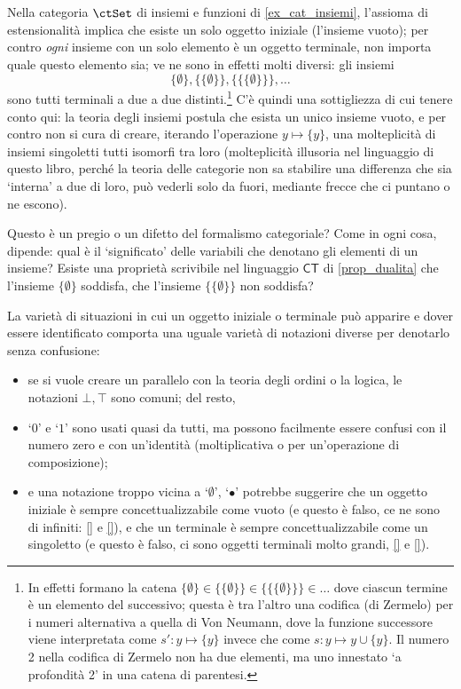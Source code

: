 \begin{example}\label{init_strict_term_many}
 Nella categoria \(\ctSet\) di insiemi e funzioni di \ref{ex_cat_insiemi}, l'assioma di estensionalità implica che esiste un solo oggetto iniziale (l'insieme vuoto); per contro \emph{ogni} insieme con un solo elemento è un oggetto terminale, non importa quale questo elemento sia; ve ne sono in effetti molti diversi: gli insiemi
 \[\{\emptyset\},\{\{\emptyset\}\},\{\{\{\emptyset\}\}\},\dots\]
 sono tutti terminali a due a due distinti.\footnote{In effetti formano la catena $\{\emptyset\}\in\{\{\emptyset\}\}\in\{\{\{\emptyset\}\}\}\in\dots$ dove ciascun termine è un elemento del successivo; questa è tra l'altro una codifica (di Zermelo) per i numeri alternativa a quella di Von Neumann, dove la funzione successore viene interpretata come $s' : y \mapsto \{y\}$ invece che come $s : y\mapsto y \cup \{y\}$. Il numero 2 nella codifica di Zermelo non ha due elementi, ma uno innestato `a profondità 2' in una catena di parentesi.} C'è quindi una sottigliezza di cui tenere conto qui: la teoria degli insiemi postula che esista un unico insieme vuoto, e per contro non si cura di creare, iterando l'operazione \(y\mapsto\{y\}\), una molteplicità di insiemi singoletti tutti isomorfi tra loro (molteplicità illusoria nel linguaggio di questo libro, perché la teoria delle categorie non sa stabilire una differenza che sia `interna' a due di loro, può vederli solo da fuori, mediante frecce che ci puntano o ne escono).
\end{example}
Questo è un pregio o un difetto del formalismo categoriale? Come in ogni cosa, dipende: qual è il `significato' delle variabili che denotano gli elementi di un insieme? Esiste una proprietà scrivibile nel linguaggio \(\mathsf{CT}\) di \ref{prop_dualita} che l'insieme \(\{\emptyset\}\) soddisfa, che l'insieme \(\{\{\emptyset\}\}\) non soddisfa?
\begin{remark}\label{notazioni_init_term}
 La varietà di situazioni in cui un oggetto iniziale o terminale può apparire e dover essere identificato comporta una uguale varietà di notazioni diverse per denotarlo senza confusione:
 \begin{itemize}
  \item se si vuole creare un parallelo con la teoria degli ordini o la logica, le notazioni \(\bot,\top\) sono comuni; del resto,
  \item `\(0\)' e `\(1\)' sono usati quasi da tutti, ma possono facilmente essere confusi con il numero zero e con un'identità (moltiplicativa o per un'operazione di composizione);
  \item e una notazione troppo vicina a `\(\emptyset\)', `\(\bullet\)' potrebbe suggerire che un oggetto iniziale è sempre concettualizzabile come vuoto (e questo è falso, ce ne sono di infiniti: \ref{} e \ref{}), e che un terminale è sempre concettualizzabile come un singoletto (e questo è falso, ci sono oggetti terminali molto grandi, \ref{} e \ref{}).
 \end{itemize}
\end{remark}
